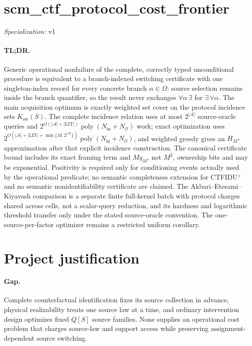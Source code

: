 \documentclass{article}
\begin{document}
\sloppy

\section*{scm\_\allowbreak{}ctf\_\allowbreak{}protocol\_\allowbreak{}cost\_\allowbreak{}frontier}

\noindent\textit{Specialization:} v1\par

\paragraph{TL;DR.} Generic operational nonfailure of the complete, correctly typed unconditional procedure is equivalent to a branch-indexed switching certificate with one singleton-index record for every concrete branch \(\alpha\in\Omega\): source selection remains inside the branch quantifier, so the result never exchanges \(\forall\alpha\,\exists\) for \(\exists\,\forall\alpha\).  The main acquisition optimum is exactly weighted set cover on the protocol incidence sets \(K_{\mathrm{sw}}(S)\).  The complete incidence relation uses at most \(2^{|\mathcal A|}\) source-oracle queries and \(2^{O(|\mathcal A|+|\mathrm{LIT}|)}\operatorname{poly}(N_{\mathrm{in}}+N_{\mathcal O})\) work; exact optimization uses \(2^{O(|\mathcal A|+|\mathrm{LIT}|+\min\{M,2^{|\mathcal A|}\})}\operatorname{poly}(N_{\mathrm{in}}+N_{\mathcal O})\), and weighted greedy gives an \(H_M\)-approximation after that explicit incidence construction.  The canonical certificate bound includes its exact framing term and \(Mq_M\), not \(M^2\), ownership bits and may be exponential.  Positivity is required only for conditioning events actually used by the operational predicate; no semantic completeness extension for CTFIDU\({}^{+}\) and no semantic nonidentifiability certificate are claimed.  The Akbari--Etesami--Kiyavash comparison is a separate finite full-kernel batch with protocol charges shared across cells, not a scalar-query reduction, and its hardness and logarithmic threshold transfer only under the stated source-oracle convention.  The one-source-per-factor optimizer remains a restricted uniform corollary.

\section{Project justification}

\paragraph{Gap.} Complete counterfactual identification fixes its source collection in advance, physical realizability treats one source law at a time, and ordinary intervention design optimizes fixed \(Q[S]\) source families. None supplies an operational cost problem that charges source-law and support access while preserving assignment-dependent source switching.
\end{document}
